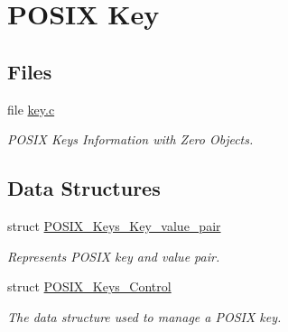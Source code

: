 \hypertarget{group__POSIX__KEY}{}\section{P\+O\+S\+IX Key}
\label{group__POSIX__KEY}
\subsection*{Files}
\begin{DoxyCompactItemize}
\item 
file \mbox{\hyperlink{key_8c}{key.\+c}}
\begin{DoxyCompactList}\small\item\em P\+O\+S\+IX Keys Information with Zero Objects. \end{DoxyCompactList}\end{DoxyCompactItemize}
\subsection*{Data Structures}
\begin{DoxyCompactItemize}
\item 
struct \mbox{\hyperlink{structPOSIX__Keys__Key__value__pair}{P\+O\+S\+I\+X\+\_\+\+Keys\+\_\+\+Key\+\_\+value\+\_\+pair}}
\begin{DoxyCompactList}\small\item\em Represents P\+O\+S\+IX key and value pair. \end{DoxyCompactList}\item 
struct \mbox{\hyperlink{structPOSIX__Keys__Control}{P\+O\+S\+I\+X\+\_\+\+Keys\+\_\+\+Control}}
\begin{DoxyCompactList}\small\item\em The data structure used to manage a P\+O\+S\+IX key. \end{DoxyCompactList}\end{DoxyCompactItemize}
